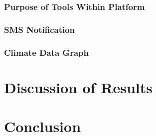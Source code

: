 \documentclass{article}
\begin{document}
\subsubsection{Purpose of Tools Within Platform}
\subsubsection{SMS Notification}
\subsubsection{Climate Data Graph}




\section{Discussion of Results}

\section{Conclusion}
\end{document}
